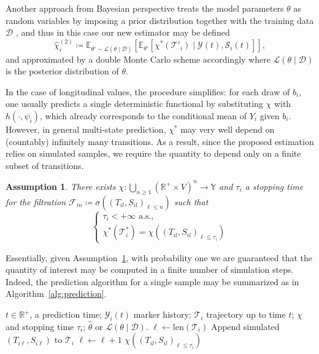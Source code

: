 \documentclass{sn-jnl}
\newtheorem{assumption}{Assumption}
\begin{document}
\bigbreak

Another approach from Bayesian perspective treats the model parameters $\theta$ as random variables by imposing a prior distribution together with the training data $\mathcal{D}$ \citep{rizopoulos2011dynamic}, and thus in this case our new estimator may be defined
\[
    \hat{\chi}_i^{(2)} \coloneqq \mathbb{E}_{\theta' \sim \mathscr{L}(\theta \mid \mathcal{D})}\left[ \mathbb{E}_{\theta'}\left[ \chi^*(\mathcal{T}'_i) \mid \mathcal{Y}(t), \mathcal{S}_i(t) \right] \right],
\]
and approximated by a double Monte Carlo scheme accordingly where $\mathscr{L}(\theta \mid \mathcal{D})$ is the posterior distribution of $\theta$.

\bigbreak

In the case of longitudinal values, the procedure simplifies: for each draw of $b_i$, one usually predicts a single deterministic functional by substituting $\chi$ with $h(\cdot, \psi_i)$, which already corresponds to the conditional mean of $Y_i$ given $b_i$. However, in general multi-state prediction, $\chi^*$ may very well depend on (countably) infinitely many transitions. As a result, since the proposed estimation relies on simulated samples, we require the quantity to depend only on a finite subset of transitions.

\begin{assumption} \label{ass:simulatable}
    There exists  $\chi: \bigcup_{n \geq 1} (\mathbb{R}^+ \times V)^n \to \mathbb{Y}$ and $\tau_i$ a stopping time for the filtration $\mathcal{F}_{in} \coloneqq \sigma\left( (T_{il}, S_{il})_{\ell \leq n} \right)$ such that
    \[
        \begin{cases}
            \tau_i < +\infty \text{ a.s.}, \\
            \chi^*(\mathcal{T}_i^*) = \chi\left( (T_{il}, S_{il})_{\ell \leq \tau_i} \right)
        \end{cases}
    \]
\end{assumption}

Essentially, given Assumption~\ref{ass:simulatable}, with probability one we are guaranteed that the quantity of interest may be computed in a finite number of simulation steps. Indeed, the prediction algorithm for a single sample may be summarized as in Algorithm~\ref{alg:prediction}.

\begin{algorithm}[H]
    \caption{Prediction algorithm}
    \label{alg:prediction}
    \begin{algorithmic}[1]
        \algrenewcommand{}
        \Require $t \in \mathbb{R}^+$, a prediction time; $\mathcal{Y}_i(t)$ marker history; $\mathcal{T}_i$ trajectory up to time $t$; $\chi$ and stopping time $\tau_i$; $\hat{\theta}$ or $\mathscr{L}(\theta \mid \mathcal{D})$.
        \Statex
        \State $\ell \gets \mathrm{len}(\mathcal{T}_i)$
        \State Append simulated $(T_{i\ell}, S_{i\ell})$ to $\mathcal{T}_i$
        \State $\ell \gets \ell + 1$
        \EndWhile
        \State \Return $\chi\left( (T_{il}, S_{il})_{\ell \leq \tau_i} \right)$
    \end{algorithmic}
\end{algorithm}
\end{document}
